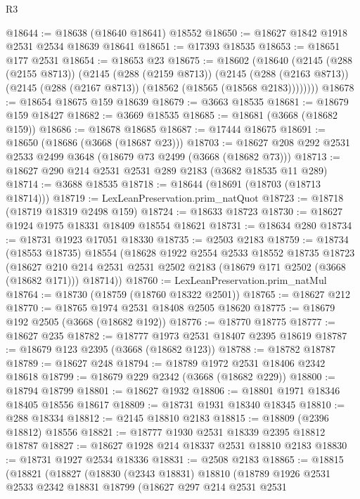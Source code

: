 \begin{lexlean}{R3}
\begin{coremodule}
@18644 := @18638 (@18640 @18641) @18552
@18650 := @18627 @1842 @1918 @2531 @2534 @18639 @18641
@18651 := @17393 @18535
@18653 := @18651 @177 @2531
@18654 := @18653 @23
@18675 := @18602
    (@18640
      (@2145
        (@288 (@2155 @8713))
        (@2145
          (@288 (@2159 @8713))
          (@2145
            (@288 (@2163 @8713))
            (@2145 (@288 (@2167 @8713)) (@18562 (@18565 (@18568 @2183))))))))
@18678 := @18654 @18675 @159 @18639
@18679 := @3663 @18535
@18681 := @18679 @159 @18427
@18682 := @3669 @18535
@18685 := @18681 (@3668 (@18682 @159))
@18686 := @18678 @18685
@18687 := @17444 @18675
@18691 := @18650 (@18686 (@3668 (@18687 @23)))
@18703 := @18627 @208 @292 @2531 @2533 @2499 @3648 (@18679 @73 @2499 (@3668 (@18682 @73)))
@18713 := @18627 @290 @214 @2531 @2531 @289 @2183 (@3682 @18535 @11 @289)
@18714 := @3688 @18535
@18718 := @18644 (@18691 (@18703 (@18713 @18714)))
@18719 := LexLeanPreservation.prim_natQuot
@18723 := @18718 (@18719 @18319 @2498 @159)
@18724 := @18633 @18723
@18730 := @18627 @1924 @1975 @18331 @18409 @18554 @18621
@18731 := @18634 @280
@18734 := @18731 @1923 @17051 @18330
@18735 := @2503 @2183
@18759 := @18734
    (@18553 @18735)
    @18554
    (@18628
      @1922
      @2554
      @2533
      @18552
      @18735
      @18723
      (@18627 @210 @214 @2531 @2531 @2502 @2183 (@18679 @171 @2502 (@3668 (@18682 @171))) @18714))
@18760 := LexLeanPreservation.prim_natMul
@18764 := @18730 (@18759 (@18760 @18322 @2501))
@18765 := @18627 @212
@18770 := @18765 @1974 @2531 @18408 @2505 @18620
@18775 := @18679 @192 @2505 (@3668 (@18682 @192))
@18776 := @18770 @18775
@18777 := @18627 @235
@18782 := @18777 @1973 @2531 @18407 @2395 @18619
@18787 := @18679 @123 @2395 (@3668 (@18682 @123))
@18788 := @18782 @18787
@18789 := @18627 @248
@18794 := @18789 @1972 @2531 @18406 @2342 @18618
@18799 := @18679 @229 @2342 (@3668 (@18682 @229))
@18800 := @18794 @18799
@18801 := @18627 @1932
@18806 := @18801 @1971 @18346 @18405 @18556 @18617
@18809 := @18731 @1931 @18340 @18345
@18810 := @288 @18334
@18812 := @2145 @18810 @2183
@18815 := @18809 (@2396 @18812) @18556
@18821 := @18777 @1930 @2531 @18339 @2395 @18812 @18787
@18827 := @18627 @1928 @214 @18337 @2531 @18810 @2183
@18830 := @18731 @1927 @2534 @18336
@18831 := @2508 @2183
@18865 := @18815
    (@18821
      (@18827
        (@18830
          (@2343 @18831)
          @18810
          (@18789
            @1926
            @2531
            @2533
            @2342
            @18831
            @18799
            (@18627
              @297
              @214
              @2531
              @2531

\end{coremodule}
\end{lexlean}
